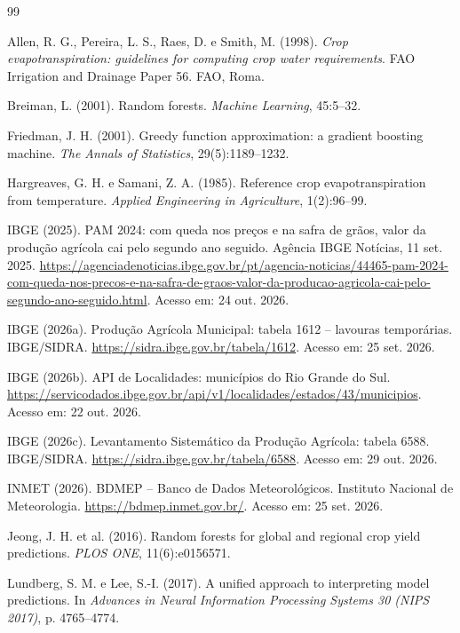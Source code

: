 \documentclass[12pt]{article}
\begin{document}
\begin{thebibliography}{99}

Allen, R. G., Pereira, L. S., Raes, D. e Smith, M. (1998). \emph{Crop
evapotranspiration: guidelines for computing crop water requirements}. FAO
Irrigation and Drainage Paper 56. FAO, Roma.

Breiman, L. (2001). Random forests. \emph{Machine Learning}, 45:5--32.

Friedman, J. H. (2001). Greedy function approximation: a gradient boosting
machine. \emph{The Annals of Statistics}, 29(5):1189--1232.

Hargreaves, G. H. e Samani, Z. A. (1985). Reference crop evapotranspiration
from temperature. \emph{Applied Engineering in Agriculture}, 1(2):96--99.

IBGE (2025). PAM 2024: com queda nos preços e na safra de grãos, valor da
produção agrícola cai pelo segundo ano seguido. Agência IBGE Notícias, 11
set. 2025.
\url{https://agenciadenoticias.ibge.gov.br/pt/agencia-noticias/44465-pam-2024-com-queda-nos-precos-e-na-safra-de-graos-valor-da-producao-agricola-cai-pelo-segundo-ano-seguido.html}.
Acesso em: 24 out. 2026.

IBGE (2026a). Produção Agrícola Municipal: tabela 1612 -- lavouras
temporárias. IBGE/SIDRA. \url{https://sidra.ibge.gov.br/tabela/1612}.
Acesso em: 25 set. 2026.

IBGE (2026b). API de Localidades: municípios do Rio Grande do Sul.
\url{https://servicodados.ibge.gov.br/api/v1/localidades/estados/43/municipios}.
Acesso em: 22 out. 2026.

IBGE (2026c). Levantamento Sistemático da Produção Agrícola: tabela 6588.
IBGE/SIDRA. \url{https://sidra.ibge.gov.br/tabela/6588}.
Acesso em: 29 out. 2026.

INMET (2026). BDMEP -- Banco de Dados Meteorológicos. Instituto Nacional de
Meteorologia. \url{https://bdmep.inmet.gov.br/}. Acesso em: 25 set. 2026.

Jeong, J. H. et al. (2016). Random forests for global and regional crop
yield predictions. \emph{PLOS ONE}, 11(6):e0156571.

Lundberg, S. M. e Lee, S.-I. (2017). A unified approach to interpreting
model predictions. In \emph{Advances in Neural Information Processing
Systems 30 (NIPS 2017)}, p. 4765--4774.


\end{thebibliography}
\end{document}
